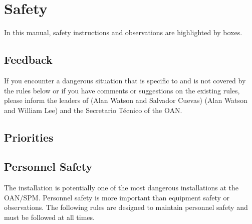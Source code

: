 \chapter{Safety}
\label{chapter:safety}


In this manual, safety instructions and observations are highlighted by boxes.
\section{Feedback}

If you encounter a dangerous situation that is specific to {\projectname} and is not covered by the rules below or if you have comments or suggestions on the existing rules, please inform the leaders of {\projectname}
\ifcoatli
(Alan Watson and Salvador Cuevas)
\fi
\ifddoti 
(Alan Watson and William Lee) 
\fi
and the Secretario Técnico of the OAN.

\section{Priorities}


\section{Personnel Safety}
\label{section:personnel-safety}

The {\projectname} installation is potentially one of the most dangerous installations at the OAN/SPM. Personnel safety is more important than equipment safety or observations. The following  rules are designed to maintain personnel safety and must be followed at all times.




